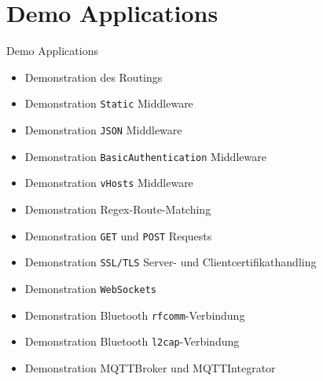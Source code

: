 ﻿\section{Demo Applications}

\begin{frame}{Demo Applications}
  \begin{itemize}
    \item Demonstration des Routings
    \item Demonstration \texttt{Static} Middleware
    \item Demonstration \texttt{JSON} Middleware
    \item Demonstration \texttt{BasicAuthentication} Middleware
    \item Demonstration \texttt{vHosts} Middleware
    \item Demonstration Regex-Route-Matching
    \item Demonstration \texttt{GET} und \texttt{POST} Requests
    \item Demonstration \texttt{SSL/TLS} Server- und Clientcertifikathandling
    \item Demonstration \texttt{WebSockets}
    \item Demonstration Bluetooth \texttt{rfcomm}-Verbindung
    \item Demonstration Bluetooth \texttt{l2cap}-Verbindung
    \item Demonstration MQTTBroker und MQTTIntegrator
  \end{itemize}
\end{frame}
